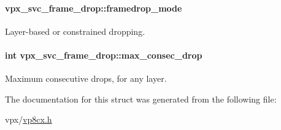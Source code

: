 \paragraph[{\texorpdfstring{framedrop\+\_\+mode}{framedrop_mode}}]{ vpx\+\_\+svc\+\_\+frame\+\_\+drop\+::framedrop\+\_\+mode}\hypertarget{structvpx__svc__frame__drop_acdde4f09ba5bdaff7e6418bb15350a99}{}\label{structvpx__svc__frame__drop_acdde4f09ba5bdaff7e6418bb15350a99}
Layer-\/based or constrained dropping. 
\paragraph[{\texorpdfstring{max\+\_\+consec\+\_\+drop}{max_consec_drop}}]{\setlength{\rightskip}{0pt plus 5cm}int vpx\+\_\+svc\+\_\+frame\+\_\+drop\+::max\+\_\+consec\+\_\+drop}\hypertarget{structvpx__svc__frame__drop_aed72507d558a7133fe3493d501798f26}{}\label{structvpx__svc__frame__drop_aed72507d558a7133fe3493d501798f26}
Maximum consecutive drops, for any layer. 

The documentation for this struct was generated from the following file\+:\begin{DoxyCompactItemize}
\item 
vpx/\hyperlink{vp8cx_8h}{vp8cx.\+h}\end{DoxyCompactItemize}
